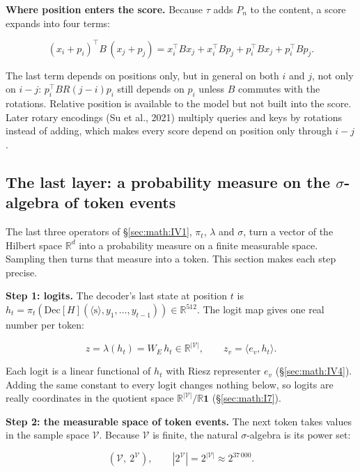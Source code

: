 \textbf{Where position enters the score.} Because \(\tau\) adds \(P_n\) to the
content, a score expands into four terms:

\[
(x_i + p_i)^\top B\,(x_j + p_j) = x_i^\top B x_j + x_i^\top B p_j + p_i^\top B x_j + p_i^\top B p_j .
\]

The last term depends on positions only, but in general on both \(i\) and \(j\),
not only on \(i - j\): \(p_i^{\top} B R(j - i) p_i\) still depends on \(p_i\)
unless \(B\) commutes with the rotations. Relative position is available to
the model but not built into the score. Later rotary encodings (Su et al., 2021) multiply
queries and keys by rotations instead of adding, which makes every score
depend on position only through \(i - j\).

\subsection{\texorpdfstring{The last layer: a probability measure on the \(\sigma\)-algebra
of token events}{The last layer: a probability measure on the sigma-algebra of token events}}\label{sec:math:IV5}

The last three operators of \S\ref{sec:math:IV1}, \(\pi_t\), \(\lambda\) and \(\sigma\), turn a vector of the
Hilbert space \(\mathbb{R}^{d}\) into a probability measure on a finite
measurable space. Sampling then turns that measure into a token. This
section makes each step precise.

\textbf{Step 1: logits.} The decoder's last state at position \(t\) is \(h_t
= \pi_t(\mathrm{Dec}[H](\langle\mathrm{s}\rangle, y_{1}, \ldots, y_{t-1})) \in
\mathbb{R}^{512}\). The logit map gives one real number per token:

\[
z = \lambda(h_t) = W_E\, h_t \in \mathbb R^{|\mathcal V|}, \qquad z_v = \langle e_v, h_t\rangle .
\]

Each logit is a linear functional of \(h_t\) with Riesz representer \(e_v\)
(\S\ref{sec:math:IV4}). Adding the same constant to every logit changes nothing below,
so logits are really coordinates in the quotient space
\(\mathbb{R}^{|\mathcal{V}|} /
\mathbb{R}\mathbf{1}\) (\S\ref{sec:math:I7}).

\textbf{Step 2: the measurable space of token events.} The next token
takes values in the sample space \(\mathcal{V}\). Because
\(\mathcal{V}\) is finite, the natural \(\sigma\)-algebra is its power set:

\[
(\mathcal V,\ 2^{\mathcal V}), \qquad |2^{\mathcal V}| = 2^{|\mathcal V|} \approx 2^{37\,000}.
\]

